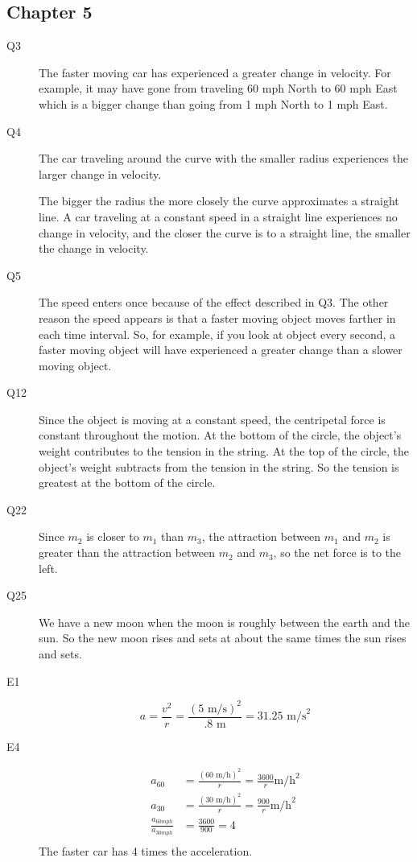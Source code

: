 \documentclass{exam}
\begin{document}
\subsection{Chapter 5}
\begin{description}

\item[Q3]
The faster moving car has experienced a greater change in velocity.  For example, it may have gone from traveling 60 mph
North to 60 mph East which is a bigger change than going from 1 mph North to 1 mph East.

\item[Q4]
The car traveling around the curve with the smaller radius experiences the larger change in velocity.

The bigger the radius the more closely the curve approximates a straight line.  A car traveling at a constant speed in a
straight line experiences no change in velocity, and the closer the curve is to a straight line, the smaller the change
in velocity.

\item[Q5]
The speed enters once because of the effect described in Q3.  The other reason the speed appears is that a faster moving object
moves farther in each time interval.  So, for example, if you look at object every second, a faster moving object will
have experienced a greater change than a slower moving object.

\item[Q12]
Since the object is moving at a constant speed, the centripetal force is constant throughout the motion.  At the bottom
of the circle, the object's weight contributes to the tension in the string.  At the top of the circle, the object's
weight subtracts from the tension in the string.  So the tension is greatest at the bottom of the circle.

\item[Q22]
Since $m_2$ is closer to $m_1$ than $m_3$, the attraction between $m_1$ and $m_2$ is greater than the attraction between $m_2$ and $m_3$, so
the net force is to the left.

\item[Q25]
We have a new moon when the moon is roughly between the earth and the sun.  So the new moon rises and sets at about the
same times the sun rises and sets.

\item[E1]
\[
  a = \frac{v^2}{r} = \frac{(5 \text{ m/s})^2}{.8 \text{ m}} = 31.25 \text{ m/s}^2
\]

\item[E4]
\begin{align*}
  a_{60} &= \frac{(60 \text{ m/h})^2}{r} = \frac{3600}{r} \text{m/h}^2 \\
  a_{30} &= \frac{(30 \text{ m/h})^2}{r} = \frac{900}{r} \text{m/h}^2 \\
  \frac{a_{60 mph}}{a_{30 mph}} &= \frac{3600}{900} = 4 \\ 
\end{align*}
The faster car has 4 times the acceleration.


\end{description}
\end{document}
